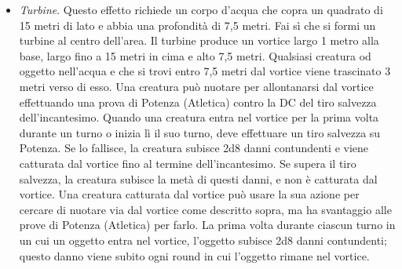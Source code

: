 \begin{multicols}{2}
\begin{itemize}
\item 
\textit{Turbine}. Questo effetto richiede un corpo d’acqua che copra un quadrato di 15 metri di lato e abbia una profondità di 7,5 metri. Fai sì che si formi un turbine al centro dell’area. Il turbine produce un vortice largo 1 metro alla base, largo fino a 15 metri in cima e alto 7,5
metri. Qualsiasi creatura od oggetto nell’acqua e che si trovi entro 7,5 metri dal vortice viene trascinato 3 metri verso di esso. Una creatura può nuotare per allontanarsi dal vortice effettuando una prova di Potenza (Atletica) contro la DC del tiro salvezza dell’incantesimo.
Quando una creatura entra nel vortice per la prima volta durante un turno o inizia lì il suo turno, deve effettuare un tiro salvezza su Potenza. Se lo fallisce, la creatura subisce 2d8 danni contundenti e viene catturata dal vortice fino al termine dell’incantesimo. Se supera il tiro salvezza, la creatura subisce la metà di questi danni, e non è catturata dal vortice. Una creatura catturata dal vortice può usare la sua azione per cercare di nuotare via dal vortice come descritto sopra, ma ha svantaggio alle prove di Potenza (Atletica) per farlo. La prima volta durante ciascun turno in un cui un oggetto entra nel vortice, l’oggetto subisce 2d8 danni contundenti; questo danno viene subito ogni round in cui l’oggetto rimane nel vortice.
\end{itemize}



\end{multicols}
